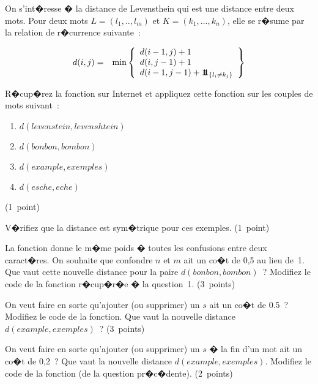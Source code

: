 \newpage


\exosubject{}
\begin{xexercice}\label{td_note_label2_2014}%

On s'int�resse � la distance de Levensthein qui est une distance entre deux mots. Pour deux mots $L=(l_1,..,l_m)$ et $K=(k_1,...,k_n)$, elle se r�sume par la relation de r�currence suivante~:

\begin{eqnarray}
d(i,j) &=&  \min \left \{ \begin{array}{l}  d(i-1,j) + 1 \\ d(i,j-1) + 1 \\ d(i-1,j-1) + \mathbf{1\!\!1}_{\left\{ l_i \neq k_j \right\}} \end{array} \right \} \label{td2013_eq21}
\end{eqnarray}

\exequest R�cup�rez la fonction sur Internet et appliquez cette fonction sur les couples de mots suivant~:

\begin{enumerate}
\item $d(levenstein,levenshtein)$
\item $d(bonbon,bombon)$
\item $d(example,exemples)$
\item $d(esche,eche)$
\end{enumerate}

(1~point)

\exequest V�rifiez que la distance est sym�trique pour ces exemples. (1~point)

\exequest La fonction donne le m�me poids � toutes les confusions entre deux caract�res. On souhaite que confondre $n$ et $m$ ait un co�t de 0,5 au lieu de~1. Que vaut cette nouvelle distance pour la paire $d(bonbon,bombon)$~? Modifiez le code de la fonction r�cup�r�e � la question~1.   (3~points)

\exequest On veut faire en sorte qu'ajouter (ou supprimer) un $s$ ait un co�t de 0.5~?  Modifiez le code de la fonction. Que vaut la nouvelle distance $d(example,exemples)$~? (3~points)

\exequest On veut faire en sorte qu'ajouter (ou supprimer) un $s$ � la fin d'un mot ait un co�t de 0,2~? Que vaut la nouvelle distance $d(example,exemples)$. Modifiez le code de la fonction (de la question pr�c�dente). (2~points)


\end{xexercice}



